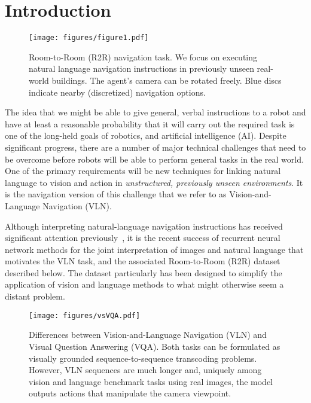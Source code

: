 \documentclass[10pt,twocolumn,letterpaper]{article}
\begin{document}
\section{Introduction}

\begin{figure}[htb]
	\begin{center}
		\texttt{[image: figures/figure1.pdf]}
	\end{center}
	\caption{	
		Room-to-Room (R2R) navigation task. We focus on executing natural language navigation instructions in previously unseen real-world buildings. The agent's camera can be rotated freely. Blue discs indicate nearby (discretized) navigation options.}
	\label{fig:concept}
\end{figure}

The idea that we might be able to give general, verbal instructions to a robot and have at least a reasonable probability that it will carry out the required task is one of the long-held goals of robotics, and artificial intelligence (AI). Despite significant progress, there are a number of major technical challenges that need to be overcome before robots will be able to perform general tasks in the real world. One of the primary requirements will be new techniques for linking natural language to vision and action in \textit{unstructured, previously unseen environments}. It is the navigation version of this challenge that we refer to as Vision-and-Language Navigation (VLN).  

Although interpreting natural-language navigation instructions has received significant attention previously~\cite{chaplot2017gated,chen2011learning,guadarrama2013grounding,mei2016listen,misra2017mapping,tellex2011understanding}, it is the recent success of recurrent neural network methods for the joint interpretation of images and natural language that motivates the VLN task, and the associated Room-to-Room (R2R) dataset described below.  The dataset particularly has been designed to simplify the application of vision and language methods to what might otherwise seem a distant problem.

\begin{figure*}[t]
	\begin{center}
		\texttt{[image: figures/vsVQA.pdf]}
	\end{center}
	\caption{Differences between Vision-and-Language Navigation (VLN)  and Visual Question Answering (VQA). Both tasks can be formulated as visually grounded sequence-to-sequence transcoding problems. However, VLN sequences are much longer and, uniquely among vision and language benchmark tasks using real images, the model outputs actions  that manipulate the camera viewpoint.}
	\label{fig:vqa}
\end{figure*}
\end{document}

